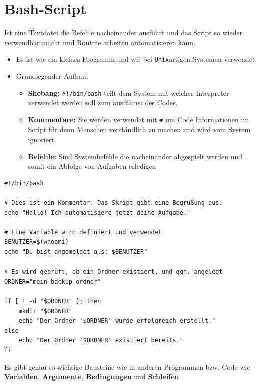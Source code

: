 \section*{Bash-Script}

Ist eine Textdatei die Befehle nacheinander ausführt und das Script so wieder verwendbar macht und Routine arbeiten automatisieren kann.

\begin{itemize}
  \item Es ist wie ein kleines Programm und wir bei \texttt{Unix}artigen Systemen verwendet
  \item Grundlegender Aufbau:
  \begin{itemize}
    \item \textbf{Shebang:} \texttt{#!/bin/bash} teilt dem System mit welcher Interpreter verwendet werden soll zum ausführen des Codes.
    \item \textbf{Kommentare:} Sie werden verwendet mit \texttt{\#} um Code Informationen im Script für denn Menschen verständlich zu machen und wird vom System ignoriert.
    \item \textbf{Befehle:} Sind Systembefehle die nacheinander abgespielt werden und somit ein Abfolge von Aufgaben erledigen
  \end{itemize}
\end{itemize}

\begin{verbatim}
#!/bin/bash

# Dies ist ein Kommentar. Das Skript gibt eine Begrüßung aus.
echo "Hallo! Ich automatisiere jetzt deine Aufgabe."

# Eine Variable wird definiert und verwendet
BENUTZER=$(whoami)
echo "Du bist angemeldet als: $BENUTZER"

# Es wird geprüft, ob ein Ordner existiert, und ggf. angelegt
ORDNER="mein_backup_ordner"

if [ ! -d "$ORDNER" ]; then
    mkdir "$ORDNER"
    echo "Der Ordner '$ORDNER' wurde erfolgreich erstellt."
else
    echo "Der Ordner '$ORDNER' existiert bereits."
fi
\end{verbatim}

Es gibt genau so wichtige Bausteine wie in anderen Programmen bzw. Code wie \textbf{Variablen}, \textbf{Argumente}, \textbf{Bedingungen} und \textbf{Schleifen}.
